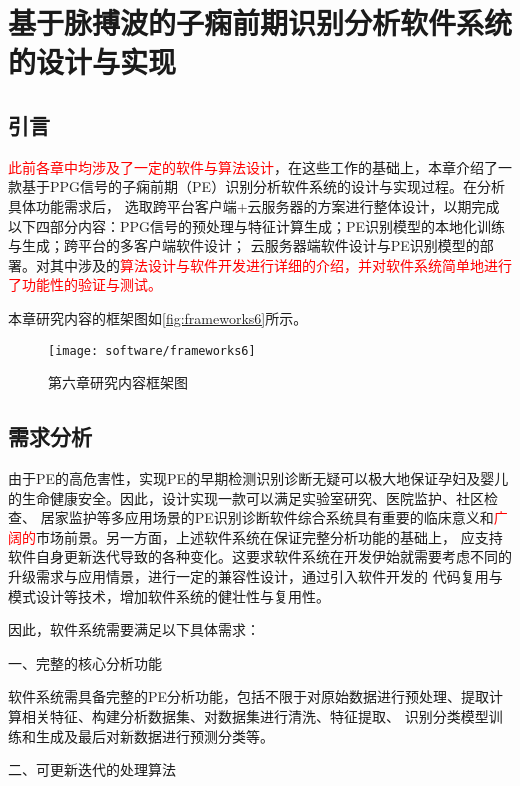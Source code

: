 \chapter{基于脉搏波的子痫前期识别分析软件系统的设计与实现}
\section{引言}
\textcolor{red}{此前各章中均涉及了一定的软件与算法设计}，在这些工作的基础上，本章介绍了一款基于PPG信号的子痫前期（PE）识别分析软件系统的设计与实现过程。在分析具体功能需求后，
选取跨平台客户端+云服务器的方案进行整体设计，以期完成以下四部分内容：PPG信号的预处理与特征计算生成；PE识别模型的本地化训练与生成；跨平台的多客户端软件设计；
云服务器端软件设计与PE识别模型的部署。对其中涉及的\textcolor{red}{算法设计与软件开发进行详细的介绍，并对软件系统简单地进行了功能性的验证与测试。}

本章研究内容的框架图如\autoref{fig:frameworks6}所示。

\begin{figure}[htbp]
    \centering
    \texttt{[image: software/frameworks6]}
    \caption{\label{fig:frameworks6}第六章研究内容框架图}
\end{figure}

\section{需求分析}
由于PE的高危害性，实现PE的早期检测识别诊断无疑可以极大地保证孕妇及婴儿的生命健康安全。因此，设计实现一款可以满足实验室研究、医院监护、社区检查、
居家监护等多应用场景的PE识别诊断软件综合系统具有重要的临床意义和\textcolor{red}{广阔的}市场前景。另一方面，上述软件系统在保证完整分析功能的基础上，
应支持软件自身更新迭代导致的各种变化。这要求软件系统在开发伊始就需要考虑不同的升级需求与应用情景，进行一定的兼容性设计，通过引入软件开发的
代码复用与模式设计等技术，增加软件系统的健壮性与复用性\cite{CJ2020,Enrich2018,Gamma1993}。

因此，软件系统需要满足以下具体需求：

一、完整的核心分析功能

软件系统需具备完整的PE分析功能，包括不限于对原始数据进行预处理、提取计算相关特征、构建分析数据集、对数据集进行清洗、特征提取、
识别分类模型训练和生成及最后对新数据进行预测分类等。

二、可更新迭代的处理算法

